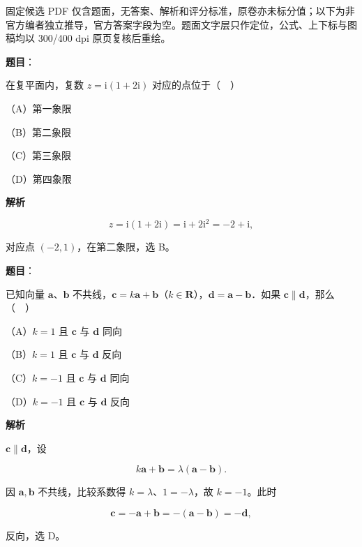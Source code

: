 

\begin{gktip}
固定候选 PDF 仅含题面，无答案、解析和评分标准，原卷亦未标分值；以下为非官方编者独立推导，官方答案字段为空。题面文字层只作定位，公式、上下标与图稿均以 300/400 dpi 原页复核后重绘。
\end{gktip}

\begin{answer}

\textbf{题目}：

在复平面内，复数 $z=\mathrm i(1+2\mathrm i)$ 对应的点位于（　）

（A）第一象限

（B）第二象限

（C）第三象限

（D）第四象限

\textbf{解析}

\nopagebreak[4]
\[z=\mathrm i(1+2\mathrm i)=\mathrm i+2\mathrm i^2=-2+\mathrm i,\]

对应点 $(-2,1)$，在第二象限，选 B。


\end{answer}
\begin{answer}

\textbf{题目}：

已知向量 $\boldsymbol a$、$\boldsymbol b$ 不共线，$\boldsymbol c=k\boldsymbol a+\boldsymbol b$（$k\in\mathbf R$），$\boldsymbol d=\boldsymbol a-\boldsymbol b$．如果 $\boldsymbol c\parallel\boldsymbol d$，那么（　）

（A）$k=1$ 且 $\boldsymbol c$ 与 $\boldsymbol d$ 同向

（B）$k=1$ 且 $\boldsymbol c$ 与 $\boldsymbol d$ 反向

（C）$k=-1$ 且 $\boldsymbol c$ 与 $\boldsymbol d$ 同向

（D）$k=-1$ 且 $\boldsymbol c$ 与 $\boldsymbol d$ 反向

\textbf{解析}

$\boldsymbol c\parallel\boldsymbol d$，设

\nopagebreak[4]
\[k\boldsymbol a+\boldsymbol b=\lambda(\boldsymbol a-\boldsymbol b).\]

因 $\boldsymbol a,\boldsymbol b$ 不共线，比较系数得 $k=\lambda$、$1=-\lambda$，故 $k=-1$。此时

\nopagebreak[4]
\[\boldsymbol c=-\boldsymbol a+\boldsymbol b=-(\boldsymbol a-\boldsymbol b)=-\boldsymbol d,\]

反向，选 D。


\end{answer}
